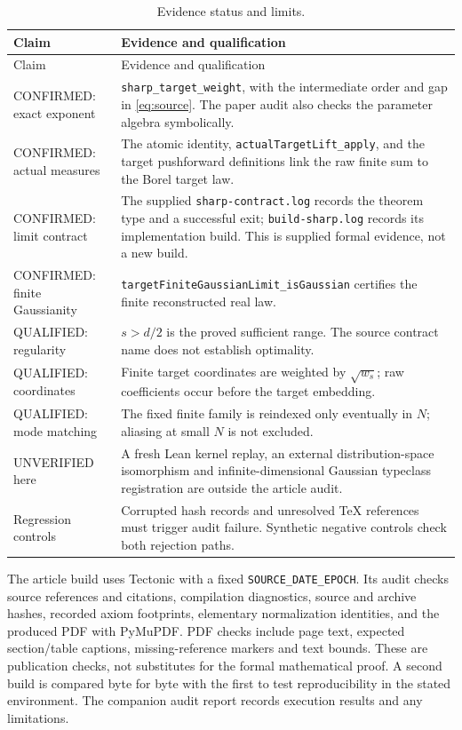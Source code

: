 \documentclass[11pt]{amsart}
\theoremstyle{remark}\newtheorem{remark}[theorem]{Remark}
\begin{document}
\begin{longtable}{p{}p{}}
\caption{Evidence status and limits.}\label{tab:ledger}\\
\toprule
Claim & Evidence and qualification\\\midrule\endfirsthead
\toprule Claim & Evidence and qualification\\\midrule\endhead
CONFIRMED: exact exponent & \texttt{sharp\_target\_weight}, with the intermediate order and gap in \eqref{eq:source}. The paper audit also checks the parameter algebra symbolically.\\[4pt]
CONFIRMED: actual measures & The atomic identity, \texttt{actualTargetLift\_apply}, and the target pushforward definitions link the raw finite sum to the Borel target law.\\[4pt]
CONFIRMED: limit contract & The supplied \texttt{sharp-contract.log} records the theorem type and a successful exit; \texttt{build-sharp.log} records its implementation build. This is supplied formal evidence, not a new build.\\[4pt]
CONFIRMED: finite Gaussianity & \texttt{targetFiniteGaussianLimit\_isGaussian} certifies the finite reconstructed real law.\\[4pt]
QUALIFIED: regularity & $s>d/2$ is the proved sufficient range. The source contract name does not establish optimality.\\[4pt]
QUALIFIED: coordinates & Finite target coordinates are weighted by $\sqrt{w_s}$; raw coefficients occur before the target embedding.\\[4pt]
QUALIFIED: mode matching & The fixed finite family is reindexed only eventually in $N$; aliasing at small $N$ is not excluded.\\[4pt]
UNVERIFIED here & A fresh Lean kernel replay, an external distribution-space isomorphism and infinite-dimensional Gaussian typeclass registration are outside the article audit.\\[4pt]
Regression controls & Corrupted hash records and unresolved TeX references must trigger audit failure. Synthetic negative controls check both rejection paths.\\
\bottomrule
\end{longtable}

The article build uses Tectonic with a fixed \texttt{SOURCE\_DATE\_EPOCH}. Its audit checks source references and citations, compilation diagnostics, source and archive hashes, recorded axiom footprints, elementary normalization identities, and the produced PDF with PyMuPDF. PDF checks include page text, expected section/table captions, missing-reference markers and text bounds. These are publication checks, not substitutes for the formal mathematical proof. A second build is compared byte for byte with the first to test reproducibility in the stated environment. The companion audit report records execution results and any limitations.
\end{document}

